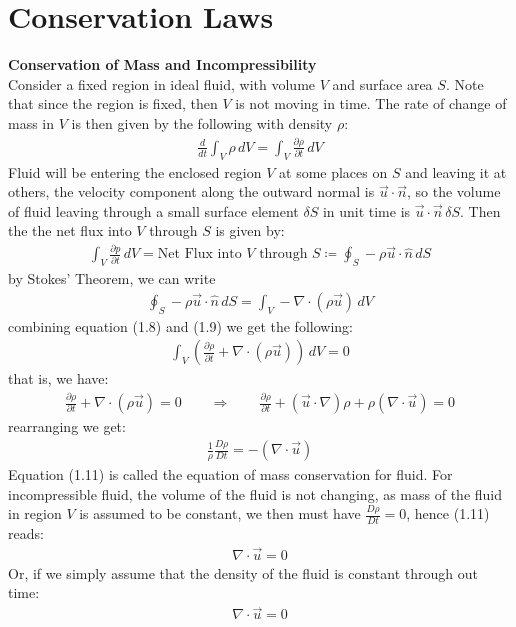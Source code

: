 \documentclass[11pt]{book}
\theoremstyle{break}
\theoremstyle{break}
\begin{document}
\section[Conservation Laws]{\color{red}Conservation Laws\color{black}}
\textbf{Conservation of Mass and Incompressibility}\\
Consider a fixed region in ideal fluid, with volume $V$ and surface area $S$. Note that since the region is fixed, then $V$ is not moving in time. The rate of change of mass in $V$ is then given by the following with density $\rho$:
\begin{align}
\frac{d}{dt}\int_V \rho\, dV = \int_V \frac{\partial \rho}{\partial t}\, dV
\end{align}
Fluid will be entering the enclosed region $V$ at some places on $S$ and leaving it at others, the velocity component along the outward normal is $\vec{u}\cdot \vec{n}$, so the volume of fluid leaving through a small surface element $\delta S$ in unit time is $\vec{u}\cdot \vec{n} \, \delta S$. Then the the net flux into $V$ through $S$ is given by:
\begin{align}
\int_V \frac{\partial p}{\partial t}\, dV = \text{Net Flux into }V \text{ through }S \coloneqq \oint_S -\rho \vec{u}\cdot \hat{n}\, dS
\end{align}
by Stokes' Theorem, we can write
\begin{align}
\oint_S -\rho \vec{u}\cdot \hat{n}\, dS = \int_V -\nabla \cdot (\rho \vec{u}) \, dV
\end{align}
combining equation (1.8) and (1.9) we get the following:
\begin{align}
\int_V \left( \frac{\partial \rho}{\partial t}+ \nabla \cdot (\rho \vec{u})\right) \, dV = 0
\end{align}
that is, we have:
\begin{align*}
\frac{\partial \rho}{\partial t} + \nabla \cdot (\rho \vec{u})  = 0 \qquad \Rightarrow \qquad \frac{\partial \rho}{\partial t} + (\vec{u}\cdot \nabla )\rho + \rho (\nabla \cdot \vec{u}) = 0 
\end{align*}
rearranging we get:
\begin{align}
\frac{1}{\rho} \frac{D\rho}{Dt} = -(\nabla \cdot \vec{u})
\end{align}
Equation (1.11) is called the equation of mass conservation for fluid. For incompressible fluid, the volume of the fluid is not changing, as mass of the fluid in region $V$ is assumed to be constant,  we then must have $\frac{D\rho}{Dt} = 0$, hence (1.11) reads:
\begin{align*}
\nabla \cdot \vec{u} = 0 \tag{Incompressible Fluid}
\end{align*}
Or, if we simply assume that the density of the fluid is constant through out time:
\begin{align*}
\nabla \cdot \vec{u} = 0 \tag{Constant Density}
\end{align*} 
\newpage
\end{document}
